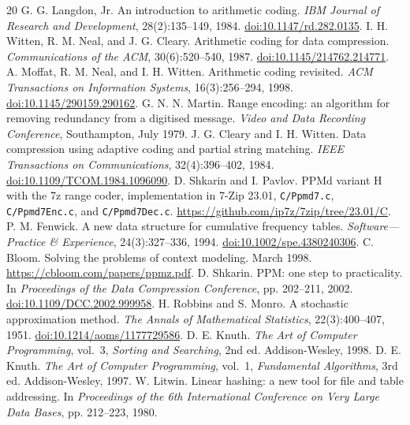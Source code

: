 \documentclass[10pt,letterpaper]{article}
\newcommand{\code}[1]{\texttt{#1}}
\begin{document}
\begingroup
\footnotesize
\begin{thebibliography}{20}
\setlength{\itemsep}{1pt}
 G. G. Langdon, Jr. An introduction to arithmetic coding. \emph{IBM Journal of Research and Development}, 28(2):135--149, 1984. \href{https://doi.org/10.1147/rd.282.0135}{doi:10.1147/rd.282.0135}.
 I. H. Witten, R. M. Neal, and J. G. Cleary. Arithmetic coding for data compression. \emph{Communications of the ACM}, 30(6):520--540, 1987. \href{https://doi.org/10.1145/214762.214771}{doi:10.1145/214762.214771}.
 A. Moffat, R. M. Neal, and I. H. Witten. Arithmetic coding revisited. \emph{ACM Transactions on Information Systems}, 16(3):256--294, 1998. \href{https://doi.org/10.1145/290159.290162}{doi:10.1145/290159.290162}.
 G. N. N. Martin. Range encoding: an algorithm for removing redundancy from a digitised message. \emph{Video and Data Recording Conference}, Southampton, July 1979.
 J. G. Cleary and I. H. Witten. Data compression using adaptive coding and partial string matching. \emph{IEEE Transactions on Communications}, 32(4):396--402, 1984. \href{https://doi.org/10.1109/TCOM.1984.1096090}{doi:10.1109/TCOM.1984.1096090}.
 D. Shkarin and I. Pavlov. PPMd variant H with the 7z range coder, implementation in 7-Zip 23.01, \code{C/Ppmd7.c}, \code{C/Ppmd7Enc.c}, and \code{C/Ppmd7Dec.c}. \url{https://github.com/ip7z/7zip/tree/23.01/C}.
 P. M. Fenwick. A new data structure for cumulative frequency tables. \emph{Software---Practice \& Experience}, 24(3):327--336, 1994. \href{https://doi.org/10.1002/spe.4380240306}{doi:10.1002/spe.4380240306}.
 C. Bloom. Solving the problems of context modeling. March 1998. \url{https://cbloom.com/papers/ppmz.pdf}.
 D. Shkarin. PPM: one step to practicality. In \emph{Proceedings of the Data Compression Conference}, pp. 202--211, 2002. \href{https://doi.org/10.1109/DCC.2002.999958}{doi:10.1109/DCC.2002.999958}.
 H. Robbins and S. Monro. A stochastic approximation method. \emph{The Annals of Mathematical Statistics}, 22(3):400--407, 1951. \href{https://doi.org/10.1214/aoms/1177729586}{doi:10.1214/aoms/1177729586}.
 D. E. Knuth. \emph{The Art of Computer Programming}, vol.~3, \emph{Sorting and Searching}, 2nd ed. Addison-Wesley, 1998.
 D. E. Knuth. \emph{The Art of Computer Programming}, vol.~1, \emph{Fundamental Algorithms}, 3rd ed. Addison-Wesley, 1997.
 W. Litwin. Linear hashing: a new tool for file and table addressing. In \emph{Proceedings of the 6th International Conference on Very Large Data Bases}, pp. 212--223, 1980.

\end{thebibliography}
\end{document}
